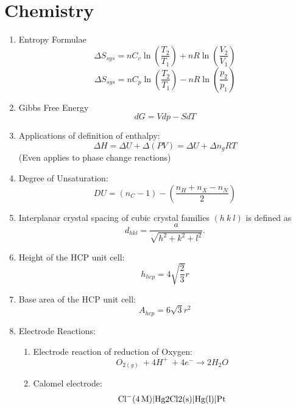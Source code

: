 \documentclass{article}
\numberwithin{equation}{section}
\numberwithin{figure}{section}
\begin{document}
\section{Chemistry}
\begin{enumerate}
	\item Entropy Formulae
\begin{equation}
	\Delta S_{sys}=n C_v \ln\left(\frac{T_2}{T_1}\right)+n R \ln\left(\frac{V_2}{V_1}\right)
\end{equation}
\begin{equation}
	\Delta S_{sys}= n C_p \ln\left(\frac{T_2}{T_1}\right)- n R \ln\left(\frac{p_2}{p_1}\right)
\end{equation}
	\item Gibbs Free Energy
\begin{equation}
	dG=Vdp-SdT
\end{equation}
	\item Applications of definition of enthalpy:
		\begin{equation}
			\Delta H=\Delta U+\Delta(PV)=\Delta U+\Delta n_g RT
		\end{equation}
		(Even applies to phase change reactions)
	\item Degree of Unsaturation:
\begin{equation}
	DU=(n_{C}-1)-\left(\frac{n_{H}+n_{X}-n_{N}}{2}\right)
\end{equation}
	\item Interplanar crystal spacing of cubic crystal families $(h \ k \ l)$ is defined as
		\begin{equation}
		d_{hkl} = \frac{a}{\sqrt{h^2+k^2+l^2}}.
		\end{equation}
	\item Height of the HCP unit cell: $$ h_{hcp}=4\sqrt{\frac{2}{3}}r$$
	\item Base area of the HCP unit cell: $$A_{hcp}=6\sqrt{3}r^2$$
	\item Electrode Reactions:
		\begin{enumerate}
			\item Electrode reaction of reduction of Oxygen:
		\begin{equation}
			O_{2(g)}\ + 4H^{+}\ + 4 e^{-} \rightarrow 2H_2 O
		\end{equation}
			\item Calomel electrode:
				\begin{equation}
					{\displaystyle {\ce {{Cl^{-}}(4M)|{Hg2Cl2(s)}|{Hg(l)}|Pt}}}
				\end{equation}
				\begin{equation}

\end{equation}
\end{enumerate}
\end{enumerate}
\end{document}
